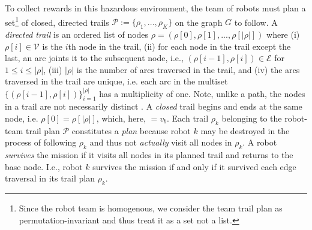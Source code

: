 \documentclass[fleqn,10pt,lineno]{wlpeerj}
\begin{document}
To collect rewards in this hazardous environment, the team of robots must plan a set\footnote{Since the robot team is homogenous, we consider the team trail plan as permutation-invariant and thus treat it as a set not a list.} of closed, directed trails $\mathcal{P}:=\{\rho_1, ..., \rho_K\}$ on the graph $G$ to follow.
A \emph{directed trail} \cite{clark1991first,graphtheory2} is an ordered list of nodes $\rho = (\rho[0], \rho[1], ..., \rho[\lvert \rho \rvert])$ where
(i) $\rho[i] \in \mathcal{V}$ is the $i$th node in the trail,  
(ii) for each node in the trail except the last, an arc joints it to the subsequent node, i.e., $(\rho[i-1], \rho[i])\in\mathcal{E}$ for $1 \leq i  \leq \lvert \rho \rvert$,
(iii) $\lvert \rho \rvert$ is the number of arcs traversed in the trail,
and
(iv) the arcs traversed in the trail are unique, i.e. each arc in the multiset $\{(\rho[i-1], \rho[i])\}_{i=1}^{\lvert \rho \rvert}$ has a multiplicity of one.
Note, unlike a path, the nodes in a trail are not necessarily distinct \cite{wilson1979introduction}.
A \emph{closed} trail begins and ends at the same node, i.e. $\rho [0]=\rho[\lvert \rho \rvert]$, which, here, $=v_b$.
Each trail $\rho_k$ belonging to the robot-team trail plan $\mathcal{P}$ constitutes a \emph{plan} because robot $k$ may be destroyed in the process of following $\rho_k$ and thus not \emph{actually} visit all nodes in $\rho_k$. A robot \emph{survives} the mission if it visits all nodes in its planned trail and returns to the base node. I.e., robot $k$ survives the mission if and only if it survived each edge traversal in its trail plan $\rho_k$.
\end{document}

